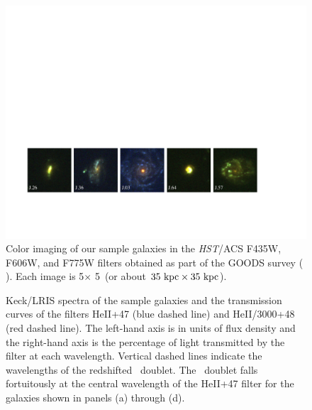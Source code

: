 \documentclass[twocolumn]{aastex62}
\begin{document}
\begin{figure}[!ht]
\centering
\includegraphics[scale=.75]{figure1.pdf}%
\caption{Color imaging of our sample galaxies in the \emph{HST}/ACS F435W, F606W, and F775W filters obtained as part of the GOODS survey (\citeauthor{Giavalisco2004} \citeyear{Giavalisco2004}). Each image is 5\arcsec $\times$ 5\arcsec\ (or about $35 \rm \ kpc \times 35 \rm \ kpc$).\label{fig:hstims}}
\end{figure}

\begin{figure}[!h]
\centering
{}
\caption{Keck/LRIS spectra of the sample galaxies and the transmission curves of the filters HeII+47 (blue dashed line) and HeII/3000+48 (red dashed line). The left-hand axis is in units of flux density and the right-hand axis is the percentage of light transmitted by the filter at each wavelength. Vertical dashed lines indicate the wavelengths of the redshifted \ doublet. The \ doublet falls fortuitously at the central wavelength of the HeII+47 filter for the galaxies shown in panels (a) through (d).}
\label{fig:spec_images}
\end{figure}
\end{document}
